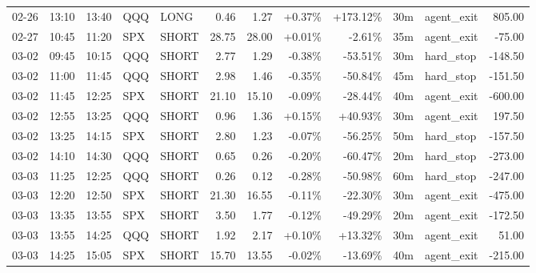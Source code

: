 \documentclass[11pt,a4paper,twoside]{article}
\begin{document}
\begin{center}
\begin{longtable}{>{\color{txtmain}}l l l l l r r r r r >{\color{txtmain}}l r}
02-26 & 13:10 & 13:40 & QQQ & LONG & 0.46 & 1.27 & \textcolor{wingreen}{+0.37\%} & \textcolor{wingreen}{+173.12\%} & 30m & agent\_exit & \textcolor{wingreen}{805.00} \\
02-27 & 10:45 & 11:20 & SPX & SHORT & 28.75 & 28.00 & \textcolor{wingreen}{+0.01\%} & \textcolor{lossred}{-2.61\%} & 35m & agent\_exit & \textcolor{lossred}{-75.00} \\
03-02 & 09:45 & 10:15 & QQQ & SHORT & 2.77 & 1.29 & \textcolor{lossred}{-0.38\%} & \textcolor{lossred}{-53.51\%} & 30m & hard\_stop & \textcolor{lossred}{-148.50} \\
03-02 & 11:00 & 11:45 & QQQ & SHORT & 2.98 & 1.46 & \textcolor{lossred}{-0.35\%} & \textcolor{lossred}{-50.84\%} & 45m & hard\_stop & \textcolor{lossred}{-151.50} \\
03-02 & 11:45 & 12:25 & SPX & SHORT & 21.10 & 15.10 & \textcolor{lossred}{-0.09\%} & \textcolor{lossred}{-28.44\%} & 40m & agent\_exit & \textcolor{lossred}{-600.00} \\
03-02 & 12:55 & 13:25 & QQQ & SHORT & 0.96 & 1.36 & \textcolor{wingreen}{+0.15\%} & \textcolor{wingreen}{+40.93\%} & 30m & agent\_exit & \textcolor{wingreen}{197.50} \\
03-02 & 13:25 & 14:15 & SPX & SHORT & 2.80 & 1.23 & \textcolor{lossred}{-0.07\%} & \textcolor{lossred}{-56.25\%} & 50m & hard\_stop & \textcolor{lossred}{-157.50} \\
03-02 & 14:10 & 14:30 & QQQ & SHORT & 0.65 & 0.26 & \textcolor{lossred}{-0.20\%} & \textcolor{lossred}{-60.47\%} & 20m & hard\_stop & \textcolor{lossred}{-273.00} \\
03-03 & 11:25 & 12:25 & QQQ & SHORT & 0.26 & 0.12 & \textcolor{lossred}{-0.28\%} & \textcolor{lossred}{-50.98\%} & 60m & hard\_stop & \textcolor{lossred}{-247.00} \\
03-03 & 12:20 & 12:50 & SPX & SHORT & 21.30 & 16.55 & \textcolor{lossred}{-0.11\%} & \textcolor{lossred}{-22.30\%} & 30m & agent\_exit & \textcolor{lossred}{-475.00} \\
03-03 & 13:35 & 13:55 & SPX & SHORT & 3.50 & 1.77 & \textcolor{lossred}{-0.12\%} & \textcolor{lossred}{-49.29\%} & 20m & agent\_exit & \textcolor{lossred}{-172.50} \\
03-03 & 13:55 & 14:25 & QQQ & SHORT & 1.92 & 2.17 & \textcolor{wingreen}{+0.10\%} & \textcolor{wingreen}{+13.32\%} & 30m & agent\_exit & \textcolor{wingreen}{51.00} \\
03-03 & 14:25 & 15:05 & SPX & SHORT & 15.70 & 13.55 & \textcolor{lossred}{-0.02\%} & \textcolor{lossred}{-13.69\%} & 40m & agent\_exit & \textcolor{lossred}{-215.00} \\

\end{longtable}
\end{center}
\end{document}
